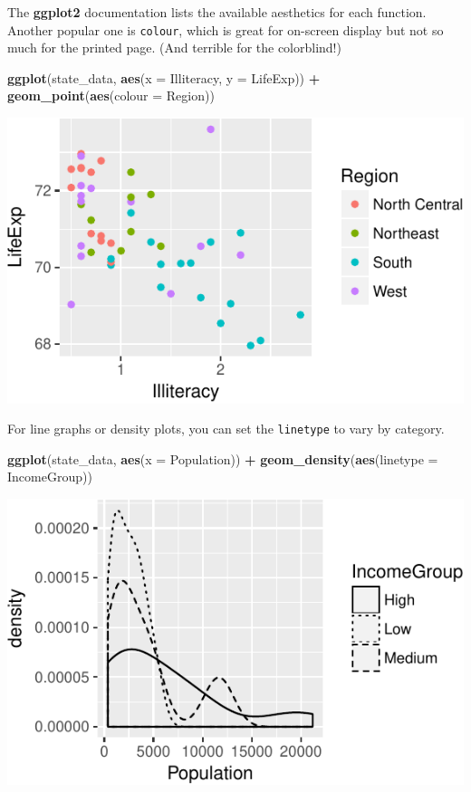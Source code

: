 \documentclass[12pt,oneside,openany]{book}
\newenvironment{Shaded}{\begin{snugshade}}{\end{snugshade}}
\newcommand{\KeywordTok}[1]{\textcolor[rgb]{0.13,0.29,0.53}{\textbf{#1}}}
\newcommand{\DataTypeTok}[1]{\textcolor[rgb]{0.13,0.29,0.53}{#1}}
\newcommand{\StringTok}[1]{\textcolor[rgb]{0.31,0.60,0.02}{#1}}
\newcommand{\OperatorTok}[1]{\textcolor[rgb]{0.81,0.36,0.00}{\textbf{#1}}}
\newcommand{\NormalTok}[1]{#1}
\begin{document}
The \textbf{ggplot2} documentation lists the available aesthetics for
each function. Another popular one is \texttt{colour}, which is great
for on-screen display but not so much for the printed page. (And
terrible for the colorblind!)

\begin{Shaded}
\begin{Highlighting}[]
\KeywordTok{ggplot}\NormalTok{(state_data, }\KeywordTok{aes}\NormalTok{(}\DataTypeTok{x =}\NormalTok{ Illiteracy, }\DataTypeTok{y =}\NormalTok{ LifeExp)) }\OperatorTok{+}
\StringTok{  }\KeywordTok{geom_point}\NormalTok{(}\KeywordTok{aes}\NormalTok{(}\DataTypeTok{colour =}\NormalTok{ Region))}
\end{Highlighting}
\end{Shaded}

\includegraphics{pdaps_files/figure-latex/aes-colour-1.pdf}

For line graphs or density plots, you can set the \texttt{linetype} to
vary by category.

\begin{Shaded}
\begin{Highlighting}[]
\KeywordTok{ggplot}\NormalTok{(state_data, }\KeywordTok{aes}\NormalTok{(}\DataTypeTok{x =}\NormalTok{ Population)) }\OperatorTok{+}
\StringTok{  }\KeywordTok{geom_density}\NormalTok{(}\KeywordTok{aes}\NormalTok{(}\DataTypeTok{linetype =}\NormalTok{ IncomeGroup))}
\end{Highlighting}
\end{Shaded}

\includegraphics{pdaps_files/figure-latex/aes-linetype-1.pdf}
\end{document}
